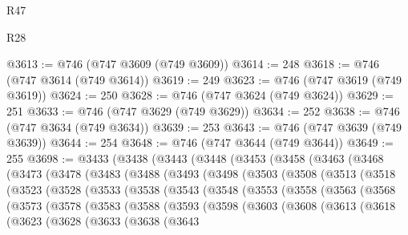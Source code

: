 \begin{lexlean}{R47}
\begin{lexlean}{R28}
\begin{coremodule}
{{{{{{{{{{{{{{{{{{{{{{{{{{{{{{{{{{{{{{{{{{{{{{{{{{{{{{{{{{{{{{{{{{{{{{{{{{{{{{{{{{{{{{{{{{{{{{{{{{{{{{{{{{{{{{{{{{{{{{{{{{{{{{{{{{{{{@3613 := @746 (@747 @3609 (@749 @3609))
@3614 := 248
@3618 := @746 (@747 @3614 (@749 @3614))
@3619 := 249
@3623 := @746 (@747 @3619 (@749 @3619))
@3624 := 250
@3628 := @746 (@747 @3624 (@749 @3624))
@3629 := 251
@3633 := @746 (@747 @3629 (@749 @3629))
@3634 := 252
@3638 := @746 (@747 @3634 (@749 @3634))
@3639 := 253
@3643 := @746 (@747 @3639 (@749 @3639))
@3644 := 254
@3648 := @746 (@747 @3644 (@749 @3644))
@3649 := 255
@3698 := @3433
    (@3438
      (@3443
        (@3448
          (@3453
            (@3458
              (@3463
                (@3468
                  (@3473
                    (@3478
                      (@3483
                        (@3488
                          (@3493
                            (@3498
                              (@3503
                                (@3508
                                  (@3513
                                    (@3518
                                      (@3523
                                        (@3528
                                          (@3533
                                            (@3538
                                              (@3543
                                                (@3548
                                                  (@3553
                                                    (@3558
                                                      (@3563
                                                        (@3568
                                                          (@3573
                                                            (@3578
                                                              (@3583
                                                                (@3588
                                                                  (@3593
                                                                    (@3598
                                                                      (@3603
                                                                        (@3608
                                                                          (@3613
                                                                            (@3618
                                                                              (@3623
                                                                                (@3628
                                                                                  (@3633
                                                                                    (@3638
                                                                                      (@3643
}}}}}}}}}}}}}}}}}}}}}}}}}}}}}}}}}}}}}}}}}}}}}}}}}}}}}}}}}}}}}}}}}}}}}}}}}}}}}}}}}}}}}}}}}}}}}}}}}}}}}}}}}}}}}}}}}}}}}}}}}}}}}}}}}}}}}
\end{coremodule}
\end{lexlean}
\end{lexlean}
